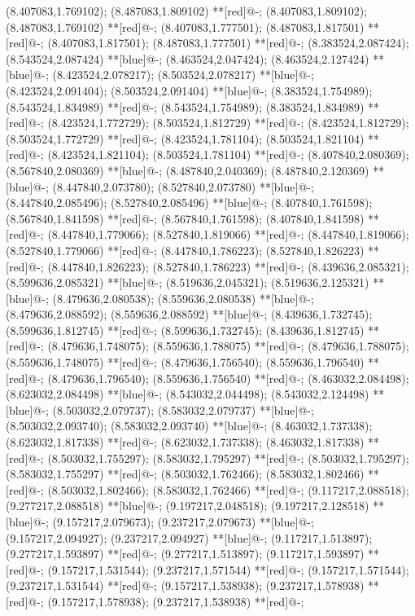 (8.407083,1.769102); (8.487083,1.809102) **[red]@{-};
(8.407083,1.809102); (8.487083,1.769102) **[red]@{-};
(8.407083,1.777501); (8.487083,1.817501) **[red]@{-};
(8.407083,1.817501); (8.487083,1.777501) **[red]@{-};
(8.383524,2.087424); (8.543524,2.087424) **[blue]@{-};
(8.463524,2.047424); (8.463524,2.127424) **[blue]@{-};
(8.423524,2.078217); (8.503524,2.078217) **[blue]@{-};
(8.423524,2.091404); (8.503524,2.091404) **[blue]@{-};
(8.383524,1.754989); (8.543524,1.834989) **[red]@{-};
(8.543524,1.754989); (8.383524,1.834989) **[red]@{-};
(8.423524,1.772729); (8.503524,1.812729) **[red]@{-};
(8.423524,1.812729); (8.503524,1.772729) **[red]@{-};
(8.423524,1.781104); (8.503524,1.821104) **[red]@{-};
(8.423524,1.821104); (8.503524,1.781104) **[red]@{-};
(8.407840,2.080369); (8.567840,2.080369) **[blue]@{-};
(8.487840,2.040369); (8.487840,2.120369) **[blue]@{-};
(8.447840,2.073780); (8.527840,2.073780) **[blue]@{-};
(8.447840,2.085496); (8.527840,2.085496) **[blue]@{-};
(8.407840,1.761598); (8.567840,1.841598) **[red]@{-};
(8.567840,1.761598); (8.407840,1.841598) **[red]@{-};
(8.447840,1.779066); (8.527840,1.819066) **[red]@{-};
(8.447840,1.819066); (8.527840,1.779066) **[red]@{-};
(8.447840,1.786223); (8.527840,1.826223) **[red]@{-};
(8.447840,1.826223); (8.527840,1.786223) **[red]@{-};
(8.439636,2.085321); (8.599636,2.085321) **[blue]@{-};
(8.519636,2.045321); (8.519636,2.125321) **[blue]@{-};
(8.479636,2.080538); (8.559636,2.080538) **[blue]@{-};
(8.479636,2.088592); (8.559636,2.088592) **[blue]@{-};
(8.439636,1.732745); (8.599636,1.812745) **[red]@{-};
(8.599636,1.732745); (8.439636,1.812745) **[red]@{-};
(8.479636,1.748075); (8.559636,1.788075) **[red]@{-};
(8.479636,1.788075); (8.559636,1.748075) **[red]@{-};
(8.479636,1.756540); (8.559636,1.796540) **[red]@{-};
(8.479636,1.796540); (8.559636,1.756540) **[red]@{-};
(8.463032,2.084498); (8.623032,2.084498) **[blue]@{-};
(8.543032,2.044498); (8.543032,2.124498) **[blue]@{-};
(8.503032,2.079737); (8.583032,2.079737) **[blue]@{-};
(8.503032,2.093740); (8.583032,2.093740) **[blue]@{-};
(8.463032,1.737338); (8.623032,1.817338) **[red]@{-};
(8.623032,1.737338); (8.463032,1.817338) **[red]@{-};
(8.503032,1.755297); (8.583032,1.795297) **[red]@{-};
(8.503032,1.795297); (8.583032,1.755297) **[red]@{-};
(8.503032,1.762466); (8.583032,1.802466) **[red]@{-};
(8.503032,1.802466); (8.583032,1.762466) **[red]@{-};
(9.117217,2.088518); (9.277217,2.088518) **[blue]@{-};
(9.197217,2.048518); (9.197217,2.128518) **[blue]@{-};
(9.157217,2.079673); (9.237217,2.079673) **[blue]@{-};
(9.157217,2.094927); (9.237217,2.094927) **[blue]@{-};
(9.117217,1.513897); (9.277217,1.593897) **[red]@{-};
(9.277217,1.513897); (9.117217,1.593897) **[red]@{-};
(9.157217,1.531544); (9.237217,1.571544) **[red]@{-};
(9.157217,1.571544); (9.237217,1.531544) **[red]@{-};
(9.157217,1.538938); (9.237217,1.578938) **[red]@{-};
(9.157217,1.578938); (9.237217,1.538938) **[red]@{-};
\endxy

